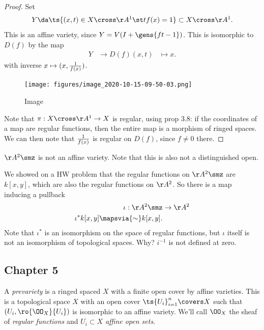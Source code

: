 \begin{proof}

Set
\begin{align*}  
Y \da \ts{(x, t) \in X\cross \AA^1 \st tf(x) = 1} \subset X\cross \AA^1
.\end{align*} This is an affine variety, since
\(Y = V(I + \gens{ft-1})\). This is isomorphic to \(D(f)\) by the map
\begin{align*}  
Y &\to D(f)
(x, t) &\mapsto x
.\end{align*} with inverse \(x \mapsto (x, {1\over f(x)})\).

\begin{figure}
\centering
\texttt{[image: figures/image\_2020-10-15-09-50-03.png]}
\caption{Image}
\end{figure}

Note that \(\pi: X\cross \AA^1 \to X\) is regular, using prop 3.8: if
the coordinates of a map are regular functions, then the entire map is a
morphism of ringed spaces. We can then note that \(1\over f(x)\) is
regular on \(D(f)\), since \(f\neq 0\) there.

\end{proof}

\begin{example}

\(\AA^2 \smz\) is not an affine variety. Note that this is also not a
distinguished open.

We showed on a HW problem that the regular functions on \(\AA^2\smz\)
are \(k[x, y]\), which are also the regular functions on \(\AA^2\). So
there is a map inducing a pullback
\begin{align*}  
\iota: \AA^2\smz &\to \AA^2 \\
\iota^* k[x, y] \mapsvia{\sim} k[x, y]
.\end{align*} Note that \(\iota^*\) is an isomorphism on the space of
regular functions, but \(\iota\) itself is not an isomorphism of
topological spaces. Why? \(i^{-1}\) is not defined at zero.

\end{example}

\hypertarget{chapter-5}{%
\subsection{Chapter 5}\label{chapter-5}}

\begin{definition}[Prevariety]

A \emph{prevariety} is a ringed spaced \(X\) with a finite open cover by
affine varieties. This is a topological space \(X\) with an open cover
\(\ts{U_i}_{i=1}^n \covers X\) such that \((U_i, \ro{\OO_X}{U_i} )\) is
isomorphic to an affine variety. We'll call \(\OO_X\) the sheaf of
\emph{regular functions} and \(U_i\subset X\) \emph{affine open sets}.

\end{definition}

